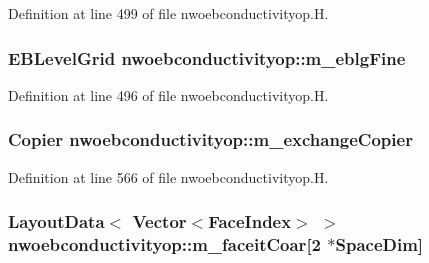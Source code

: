 Definition at line 499 of file nwoebconductivityop.\+H.

\subsubsection[{\texorpdfstring{m\+\_\+eblg\+Fine}{m_eblgFine}}]{\setlength{\rightskip}{0pt plus 5cm}E\+B\+Level\+Grid nwoebconductivityop\+::m\+\_\+eblg\+Fine\hspace{0.3cm}{\ttfamily [protected]}}\hypertarget{classnwoebconductivityop_a29eb8ad7c8ccc5d3a15b970e1a4ed834}{}\label{classnwoebconductivityop_a29eb8ad7c8ccc5d3a15b970e1a4ed834}


Definition at line 496 of file nwoebconductivityop.\+H.

\subsubsection[{\texorpdfstring{m\+\_\+exchange\+Copier}{m_exchangeCopier}}]{\setlength{\rightskip}{0pt plus 5cm}Copier nwoebconductivityop\+::m\+\_\+exchange\+Copier\hspace{0.3cm}{\ttfamily [protected]}}\hypertarget{classnwoebconductivityop_a827fe5b2f7aa82b1257bed71fd66b1c1}{}\label{classnwoebconductivityop_a827fe5b2f7aa82b1257bed71fd66b1c1}


Definition at line 566 of file nwoebconductivityop.\+H.

\subsubsection[{\texorpdfstring{m\+\_\+faceit\+Coar}{m_faceitCoar}}]{\setlength{\rightskip}{0pt plus 5cm}Layout\+Data$<$ Vector$<$Face\+Index$>$ $>$ nwoebconductivityop\+::m\+\_\+faceit\+Coar\mbox{[}2 $\ast$Space\+Dim\mbox{]}\hspace{0.3cm}{\ttfamily [protected]}}\hypertarget{classnwoebconductivityop_aa357d5ddcd66dac5ab4703e97a8db7d0}{}\label{classnwoebconductivityop_aa357d5ddcd66dac5ab4703e97a8db7d0}


